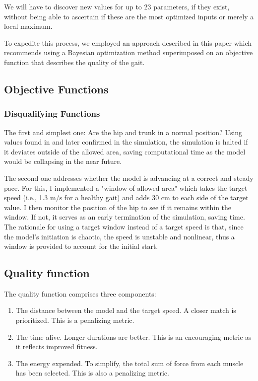 \documentclass{article}
\begin{document}
We will have to discover new values for up to 23 parameters, if they exist, without being able to ascertain if these are the most optimized inputs or merely a local maximum.

To expedite this process, we employed an approach described in this paper \cite{Sample-Efficiency} which recommends using a Bayesian optimization method superimposed on an objective function that describes the quality of the gait.

\subsection{Objective Functions}

\subsubsection{Disqualifying Functions}
The first and simplest one: Are the hip and trunk in a normal position? Using values found in \cite{winter2009biomechanics} and later confirmed in the simulation, the simulation is halted if it deviates outside of the allowed area, saving computational time as the model would be collapsing in the near future.

The second one addresses whether the model is advancing at a correct and steady pace. For this, I implemented a "window of allowed area" which takes the target speed (i.e., 1.3 m/s for a healthy gait) and adds 30 cm to each side of the target value. I then monitor the position of the hip to see if it remains within the window. If not, it serves as an early termination of the simulation, saving time. The rationale for using a target window instead of a target speed is that, since the model's initiation is chaotic, the speed is unstable and nonlinear, thus a window is provided to account for the initial start.

\subsection{Quality function}

The quality function comprises three components:

\begin{enumerate}
    \item The distance between the model and the target speed. A closer match is prioritized. This is a penalizing metric.
    
    \item The time alive. Longer durations are better. This is an encouraging metric as it reflects improved fitness.
    
    \item The energy expended. To simplify, the total sum of force from each muscle has been selected. This is also a penalizing metric.
\end{enumerate}
\end{document}
